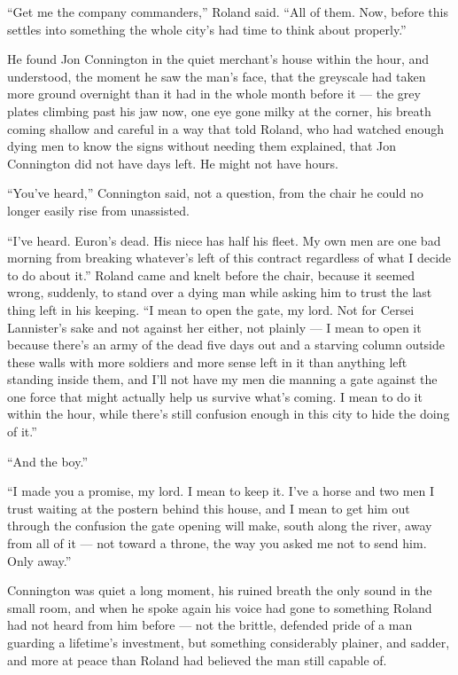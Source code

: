 “Get me the company commanders,” Roland said. “All of them. Now, before this settles into something the whole city’s had time to think about properly.”

\sceneBreak

He found Jon Connington in the quiet merchant’s house within the hour, and understood, the moment he saw the man’s face, that the greyscale had taken more ground overnight than it had in the whole month before it — the grey plates climbing past his jaw now, one eye gone milky at the corner, his breath coming shallow and careful in a way that told Roland, who had watched enough dying men to know the signs without needing them explained, that Jon Connington did not have days left. He might not have hours.

“You’ve heard,” Connington said, not a question, from the chair he could no longer easily rise from unassisted.

“I’ve heard. Euron’s dead. His niece has half his fleet. My own men are one bad morning from breaking whatever’s left of this contract regardless of what I decide to do about it.” Roland came and knelt before the chair, because it seemed wrong, suddenly, to stand over a dying man while asking him to trust the last thing left in his keeping. “I mean to open the gate, my lord. Not for Cersei Lannister’s sake and not against her either, not plainly — I mean to open it because there’s an army of the dead five days out and a starving column outside these walls with more soldiers and more sense left in it than anything left standing inside them, and I’ll not have my men die manning a gate against the one force that might actually help us survive what’s coming. I mean to do it within the hour, while there’s still confusion enough in this city to hide the doing of it.”

“And the boy.”

“I made you a promise, my lord. I mean to keep it. I’ve a horse and two men I trust waiting at the postern behind this house, and I mean to get him out through the confusion the gate opening will make, south along the river, away from all of it — not toward a throne, the way you asked me not to send him. Only away.”

Connington was quiet a long moment, his ruined breath the only sound in the small room, and when he spoke again his voice had gone to something Roland had not heard from him before — not the brittle, defended pride of a man guarding a lifetime’s investment, but something considerably plainer, and sadder, and more at peace than Roland had believed the man still capable of.

